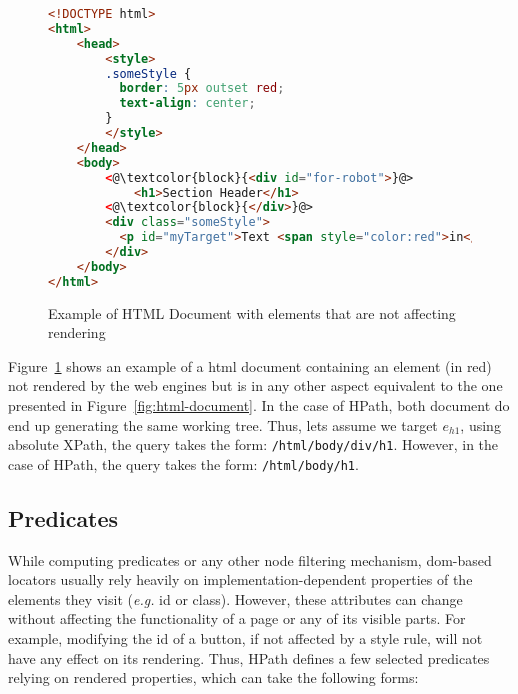 \begin{figure}
\centering
\caption{Example of HTML Document with elements that are not affecting rendering}
\label{fig:html-document-not-rendered}
\begin{minipage}{0.8\linewidth}
\begin{lstlisting}[language=HTML]
<!DOCTYPE html>
<html>
    <head>
        <style>
        .someStyle {
          border: 5px outset red;
          text-align: center;
        }
        </style>
    </head>
    <body>
        <@\textcolor{block}{<div id="for-robot">}@>
            <h1>Section Header</h1>
        <@\textcolor{block}{</div>}@>
        <div class="someStyle">
          <p id="myTarget">Text <span style="color:red">in</span> a div.</p>
        </div>
    </body>
</html>
\end{lstlisting}
\end{minipage}
\end{figure}

Figure~\ref{fig:html-document-not-rendered} shows an example of a \gls{html} document containing an element (in red) not rendered by the web engines but is in any other aspect equivalent to the one presented in Figure~\ref{fig:html-document}. In the case of HPath, both document do end up generating the same working tree. Thus, lets assume we target $e_{h1}$, using absolute XPath, the query takes the form: \texttt{/html/body/div/h1}. However, in the case of HPath, the query takes the form: \texttt{/html/body/h1}.

\subsection{Predicates}
\label{sec:hpath-hpath-predicates}

While computing predicates or any other node filtering mechanism, \gls{dom}-based locators usually rely heavily on implementation-dependent properties of the elements they visit (\emph{e.g.} id or class). However, these attributes can change without affecting the functionality of a page or any of its visible parts. For example, modifying the id of a button, if not affected by a style rule, will not have any effect on its rendering. Thus, HPath defines a few selected predicates relying on rendered properties, which can take the following forms:

